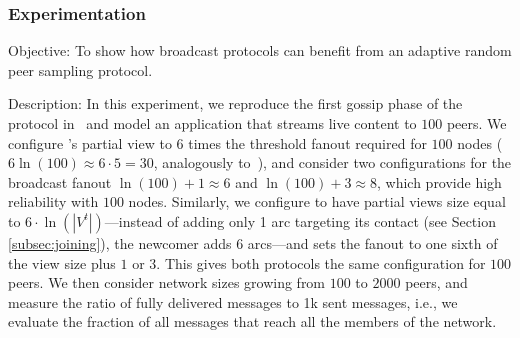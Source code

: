 \subsubsection{Experimentation}

\begin{asparadesc}
\item [Objective:] To show how broadcast protocols can benefit from
  an adaptive random peer sampling protocol.
\item [Description:] 
  In this experiment, we reproduce the first gossip phase of the
  protocol in~\cite{Frey09DSN,frey:hal-01479885,monod:THESIS} and model an
  application that streams live content to $100$ peers.
  We configure \CYCLON's partial view to $6$ times the threshold
  fanout required for $100$ nodes ($6 \ln(100) \approx 6 \cdot 5 =
  30$, analogously to~\cite{frey:hal-01479885}), and consider two configurations
  for the broadcast fanout $\ln(100)+1 \approx 6 $ and $\ln(100)+3
  \approx 8$, which provide high reliability with $100$
  nodes. Similarly, we configure \SPRAY to have partial views size
  equal to $6 \cdot \ln(|V^t|)$---instead of adding only 1 arc
  targeting its contact (see Section \ref{subsec:joining}), the
  newcomer adds 6 arcs---and sets the fanout to one sixth of the view
  size plus $1$ or $3$. This gives both protocols the same
  configuration for $100$ peers.  We then consider network sizes
  growing from $100$ to $2000$ peers, and measure the ratio of fully
  delivered messages to 1k sent messages, i.e., we evaluate the
  fraction of all messages that reach all the members of the network.


\end{asparadesc}
